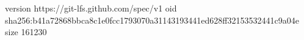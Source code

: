 version https://git-lfs.github.com/spec/v1
oid sha256:b41a72868bbca8c1e0fcc1793070a31143193441ed628ff32153532441c9a04e
size 161230
